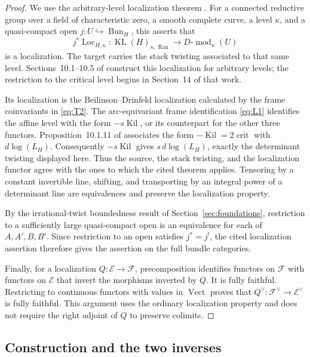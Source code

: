 \begin{proof}
We use the arbitrary-level localization theorem
\cite[Theorem~13.4.2]{GLCII}.  For a connected reductive group over a field
of characteristic zero, a smooth complete curve, a level \(\kappa\), and
a quasi-compact open \(j:U\hookrightarrow\operatorname{Bun}_H\), this
asserts that
\[
 j^*\operatorname{Loc}_{H,\kappa}:
 \operatorname{KL}(H)_{\kappa,\operatorname{Ran}}
 \longrightarrow D\text{-}\operatorname{mod}_{\kappa}(U)
\]
is a localization.  The target carries the stack twisting associated to
that same level.  Sections~10.1--10.5 of \cite{GLCII} construct this
localization for arbitrary levels; the restriction to the critical level
begins in Section~14 of that work.

Its localization is the Beilinson--Drinfeld localization calculated by
the frame coinvariants in \eqref{eq:T2}.  The arc-equivariant frame
identification \eqref{eq:L1} identifies the affine level with the form
\(-s\operatorname{Kil}\), or its counterpart for the other three
functors.  Proposition~10.1.11 of \cite{GLCII} associates the form
\(-\operatorname{Kil}=2\operatorname{crit}\) with
\(d\log(L_H)\).  Consequently \(-s\operatorname{Kil}\) gives
\(s\,d\log(L_H)\), exactly the determinant twisting displayed here.
Thus the source, the stack twisting, and the localization functor agree
with the ones to which the cited theorem applies.  Tensoring by a
constant invertible line, shifting, and transporting by an integral
power of a determinant line are equivalences and preserve the
localization property.

By the irrational-twist boundedness result of
Section~\ref{sec:foundations}, restriction to a sufficiently large
quasi-compact open is an equivalence for each of \(A,A',B,B'\).  Since
restriction to an open satisfies \(j^*=j^!\), the cited localization
assertion therefore gives the assertion on the full bundle categories.

Finally, for a localization \(Q:\mathcal E\to\mathcal F\),
precomposition identifies functors on \(\mathcal F\) with functors on
\(\mathcal E\) that invert the morphisms inverted by \(Q\).  It is
fully faithful.  Restricting to continuous functors with values in
\(\operatorname{Vect}\) proves that
\(Q^\vee:\mathcal F^\vee\to\mathcal E^\vee\) is fully faithful.
This argument uses the ordinary localization property and does not
require the right adjoint of \(Q\) to preserve colimits.
\end{proof}

\subsection{Construction and the two inverses}


